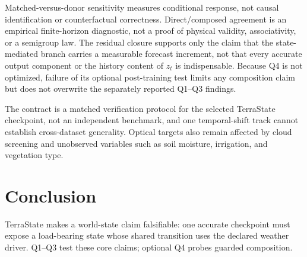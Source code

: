 \documentclass[letterpaper]{article} %
\begin{document}
Matched-versus-donor sensitivity measures conditional response, not causal
identification or counterfactual correctness. Direct/composed agreement is an
empirical finite-horizon diagnostic, not a proof of physical validity,
associativity, or a semigroup law. The residual closure supports only the claim
that the state-mediated branch carries a measurable forecast increment, not
that every accurate output component or the history content of $z_t$ is
indispensable. Because Q4 is not optimized, failure of its optional
post-training test limits any composition claim but does not overwrite the
separately reported Q1--Q3 findings.

The contract is a matched verification protocol for the selected TerraState
checkpoint, not an independent benchmark, and one temporal-shift track cannot
establish cross-dataset generality. Optical targets also remain affected by
cloud screening and unobserved variables such as soil moisture, irrigation,
and vegetation type.

\section{Conclusion}

TerraState makes a world-state claim falsifiable: one accurate checkpoint must
expose a load-bearing state whose shared transition uses the declared weather
driver. Q1--Q3 test these core claims; optional Q4 probes guarded composition.


\end{document}
